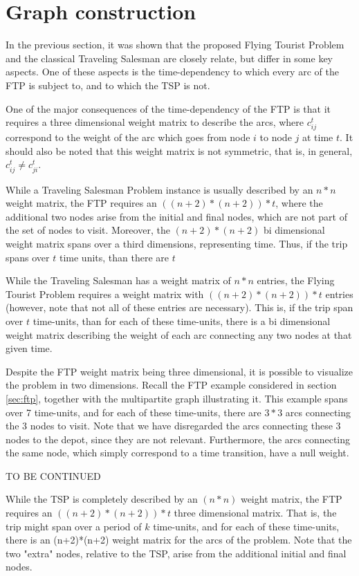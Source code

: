 \section{Graph construction}
\label{sec:ftp_graph}

In the previous section, it was shown that the proposed Flying Tourist Problem and the classical Traveling Salesman are closely relate, but differ in some key aspects. One of these aspects is the time-dependency to which every arc of the FTP is subject to, and to which the TSP is not. 

One of the major consequences of the time-dependency of the FTP is that it requires a three dimensional weight matrix to describe the arcs, where $c_{ij}^t$ correspond to the weight of the arc which goes from node $i$ to node $j$ at time $t$. It should also be noted that this weight matrix is not symmetric, that is, in general, $c_{ij}^t \neq c_{ji}^t$.

While a Traveling Salesman Problem instance is usually described by an $n*n$ weight matrix, the FTP requires an $((n+2)*(n+2))*t$, where the additional two nodes arise from the initial and final nodes, which are not part of the set of nodes to visit. Moreover, the $(n+2)*(n+2)$ bi dimensional weight matrix spans over a third dimensions, representing time. Thus, if the trip spans over $t$ time units, than there are $t$ 

While the Traveling Salesman has a weight matrix of $n*n$ entries, the Flying Tourist Problem requires a weight matrix with $((n+2)*(n+2))*t$ entries (however, note that not all of these entries are necessary).
This is, if the trip span over $t$ time-units, than for each of these time-units, there is a bi dimensional weight matrix describing the weight of each arc connecting any two nodes at that given time.

Despite the FTP weight matrix being three dimensional, it is possible to visualize the problem in two dimensions. Recall the FTP example considered in section \ref{sec:ftp}, together with the multipartite graph illustrating it.
This example spans over 7 time-units, and for each of these time-units, there are $3*3$ arcs connecting the 3 nodes to visit. Note that we have disregarded the arcs connecting these 3 nodes to the depot, since they are not relevant.
Furthermore, the arcs connecting the same node, which simply correspond to a time transition, have a null weight.

TO BE CONTINUED


While the TSP is completely described by an $(n*n)$ weight matrix, the FTP requires an $((n+2)*(n+2))*t$ three dimensional matrix. That is, the trip might span over a period of $k$ time-units, and for each of these time-units, there is an (n+2)*(n+2) weight matrix for the arcs of the problem. Note that the two "extra" nodes, relative to the TSP, arise from the additional initial and final nodes.





